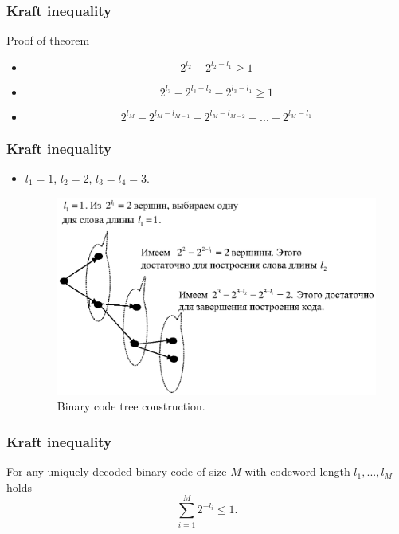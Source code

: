 \documentclass[14pt]{beamer}
\begin{document}
\begin{frame}
\frametitle{Kraft inequality}
Proof of theorem
\begin{itemize}    

    \item 
    \[
    2^{l_2 } - 2^{l_2 - l_1 } \ge 1
    \]
    
    \item
    \[
    2^{l_3 } - 2^{l_3 - l_2 } - 2^{l_3 - l_1 } \ge 1
    \]
    
    \item
    \[
    2^{l_M } - 2^{l_M - l_{M - 1} } - 2^{l_M - l_{M - 2} } - ... - 2^{l_M - l_1}
    \]


\end{itemize}
\end{frame}



\begin{frame}
\frametitle{Kraft inequality}
\begin{itemize}

    \item $l_1 = 1$, $l_2 = 2$, $l_3 = l_4 = 3$. 
    \begin{figure}[ht]
    \begin{minipage}{1.0\linewidth}
    \includegraphics[width=1.0\textwidth]{fig2_3.eps}
    \caption{Binary code tree construction.} \label{Kraft_en}
    \end{minipage}
    \end{figure}

\end{itemize}
\end{frame}



\begin{frame}
\frametitle{Kraft inequality}

    \begin{theorem} For any uniquely decoded binary code of size $M$ with codeword length $l_1 ,...,l_M $ holds
    \begin{equation}
    \label{Kraft2} \sum\limits_{i = 1}^M {2^{ - l_i } \le 1} .
    \end{equation}
    \end{theorem}
    
\end{frame}
\end{document}
